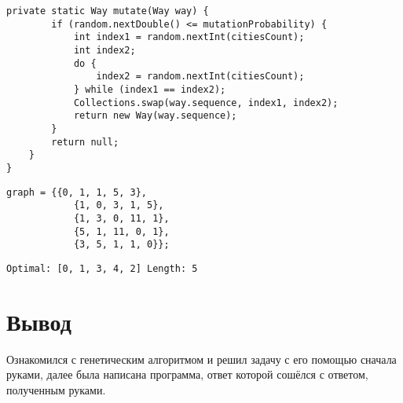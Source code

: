 \documentclass{article}
\begin{document}
\begin{lstlisting}[caption={GeneticAlgorithm}, breaklines=true, linewidth=\textwidth]
    private static Way mutate(Way way) {
        if (random.nextDouble() <= mutationProbability) {
            int index1 = random.nextInt(citiesCount);
            int index2;
            do {
                index2 = random.nextInt(citiesCount);
            } while (index1 == index2);
            Collections.swap(way.sequence, index1, index2);
            return new Way(way.sequence);
        }
        return null;
    }
}
\end{lstlisting}

\begin{lstlisting}[caption={Ввод}, breaklines=true, linewidth=\textwidth]
    graph = {{0, 1, 1, 5, 3},
            {1, 0, 3, 1, 5},
            {1, 3, 0, 11, 1},
            {5, 1, 11, 0, 1},
            {3, 5, 1, 1, 0}};
\end{lstlisting}

\begin{lstlisting}[caption={Вывод}, breaklines=true, linewidth=\textwidth]
    Optimal: [0, 1, 3, 4, 2] Length: 5
\end{lstlisting}
\section*{Вывод}
Ознакомился с генетическим алгоритмом и решил задачу с его помощью сначала руками, далее была написана программа, ответ которой сошёлся с ответом, полученным руками.
\end{document}
